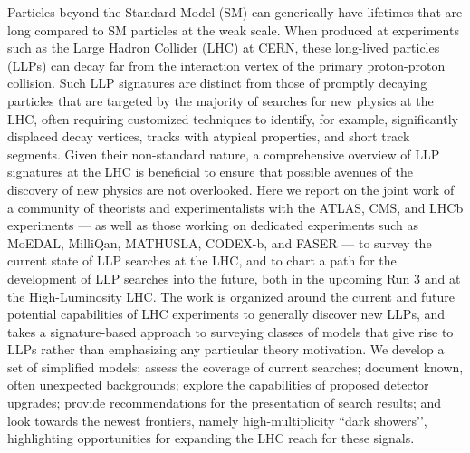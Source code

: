 Particles beyond the Standard Model (SM) can generically have lifetimes that are long compared to SM particles at the weak scale.
When produced at experiments such as the Large Hadron Collider (LHC) at CERN, these long-lived particles (LLPs) can decay far from the interaction vertex of the primary proton-proton collision.
Such LLP signatures are distinct from those of promptly decaying particles that are targeted by the majority of searches for new physics at the LHC, often requiring customized techniques to identify, for example, significantly displaced decay vertices, tracks with atypical properties, and short track segments.
Given their non-standard nature, a comprehensive overview of LLP signatures at the LHC is beneficial to ensure that possible avenues of the discovery of new physics are not overlooked.
Here we report on the joint work of a community of theorists and experimentalists with the ATLAS, CMS, and LHCb experiments --- as well as those working on dedicated experiments such as MoEDAL, MilliQan, MATHUSLA, CODEX-b, and FASER --- to survey the current state of LLP searches at the LHC, and to chart a path for the development of LLP searches into the future, both in the upcoming Run 3 and at the High-Luminosity LHC.
The work is organized around the current and future potential capabilities of LHC experiments to generally discover new LLPs, and takes a signature-based approach to surveying classes of models that give rise to LLPs rather than emphasizing any particular theory motivation.
We develop a set of simplified models; assess the coverage of current searches; document known, often unexpected backgrounds; explore the capabilities of proposed detector upgrades; provide recommendations for the presentation of search results; and look towards the newest frontiers, namely high-multiplicity ``dark showers’', highlighting opportunities for expanding the LHC reach for these signals.
